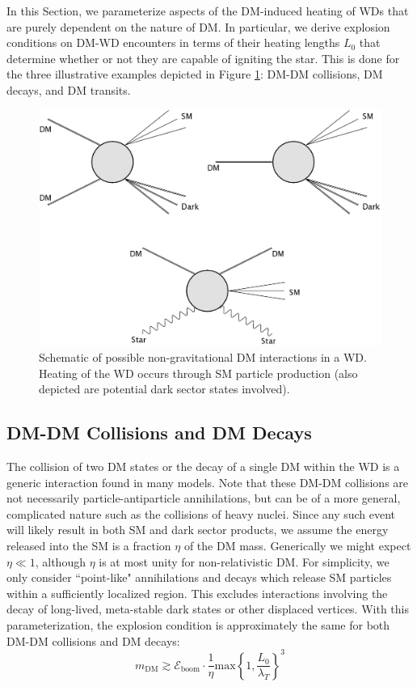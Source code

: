\documentclass[twocolumn,showpacs,preprintnumbers,amsmath,amssymb,prd]{revtex4}
\newcommand{\Eboom}{\mathcal{E}_\text{boom}}
\begin{document}
In this Section, we parameterize aspects of the DM-induced heating of WDs that are purely dependent on the nature of DM. 
In particular, we derive explosion conditions on DM-WD encounters in terms of their heating lengths $L_0$ that determine whether or not they are capable of igniting the star.
This is done for the three illustrative examples depicted in Figure \ref{fig:feynman}: DM-DM collisions, DM decays, and DM transits. 
\begin{figure}
\includegraphics[scale=0.09]{feynmandiag.jpg}
\caption{Schematic of possible non-gravitational DM interactions in a WD. Heating of the WD occurs through SM particle production (also depicted are potential dark sector states involved).}
\label{fig:feynman}
\end{figure}

\subsection{DM-DM Collisions and DM Decays}
\label{sec:DMcoldecay}

The collision of two DM states or the decay of a single DM within the WD is a generic interaction found in many models.
Note that these DM-DM collisions are not necessarily particle-antiparticle annihilations, but can be of a more general, complicated nature such as the collisions of heavy nuclei.
Since any such event will likely result in both SM and dark sector products, we assume the energy released into the SM is a fraction $\eta$ of the DM mass.
Generically we might expect $\eta \ll 1$, although $\eta$ is at most unity for non-relativistic DM.
For simplicity, we only consider ``point-like" annihilations and decays which release SM particles within a sufficiently localized region. 
This excludes interactions involving the decay of long-lived, meta-stable dark states or other displaced vertices. 
With this parameterization, the explosion condition is approximately the same for both DM-DM collisions and DM decays:
\begin{equation}
\label{eq:coldecay}
    m_\text{DM} \gtrsim \Eboom \cdot \frac{1}{\eta}
      \text{max}\left\{1, \frac{L_0}{\lambda_T}\right\}^3
\end{equation}
\end{document}
